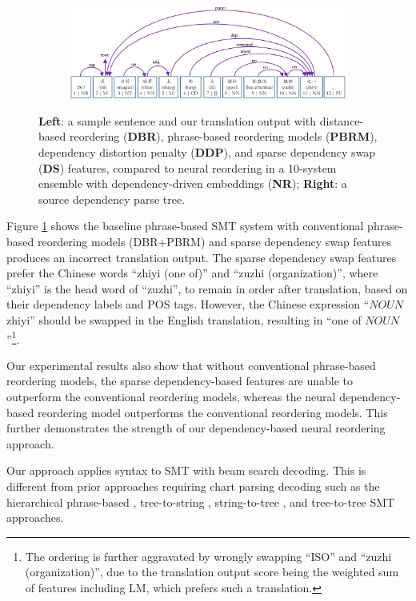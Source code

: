 \documentclass[letterpaper]{article}
\begin{document}
\begin{CJK}{UTF8}{gbsn}
\begin{figure}
\begin{subfigure}[b]{0.36\textwidth}
\end{subfigure}
\hfill
\begin{subfigure}[c]{0.6\textwidth}
{\centering
\small
\includegraphics[width=\textwidth]{comparison1parse.pdf}}
\end{subfigure}
\caption{\label{fig:comparison} {\bf Left}: a sample sentence and our translation output with distance-based reordering ({\bf DBR}), phrase-based reordering models ({\bf PBRM}), dependency distortion penalty ({\bf DDP}), and sparse dependency swap ({\bf DS}) features, compared to neural reordering in a 10-system ensemble with dependency-driven embeddings ({\bf NR}); {\bf Right}: a source dependency parse tree.}
\end{figure}
\end{CJK}

Figure \ref{fig:comparison} shows the baseline phrase-based SMT system with conventional phrase-based reordering models (DBR+PBRM) and sparse dependency swap features produces an incorrect translation output. The sparse dependency swap features prefer the Chinese words ``zhiyi (one of)'' and ``zuzhi (organization)'', where ``zhiyi'' is the head word of ``zuzhi'', to remain in order after translation, based on their dependency labels and POS tags. However, the Chinese expression ``$NOUN$ zhiyi'' should be swapped in the English translation, resulting in ``one of $NOUN$''\footnote{The ordering is further aggravated by wrongly swapping ``ISO'' and ``zuzhi (organization)'', due to the translation output score being the weighted sum of features including LM, which prefers such a translation.}.

Our experimental results also show that without conventional phrase-based reordering models, the sparse dependency-based features are unable to outperform the conventional reordering models, whereas the neural dependency-based reordering model outperforms the conventional reordering models. This further demonstrates the strength of our dependency-based neural reordering approach.

Our approach applies syntax to SMT with beam search decoding. This is different from prior approaches requiring chart parsing decoding such as the hierarchical phrase-based \cite{chiang_hierarchical_2007}, tree-to-string \cite{liu_tree--string_2006}, string-to-tree \cite{marcu_spmt:_2006}, and tree-to-tree \cite{zhai_simple_2011} SMT approaches.
\end{document}
